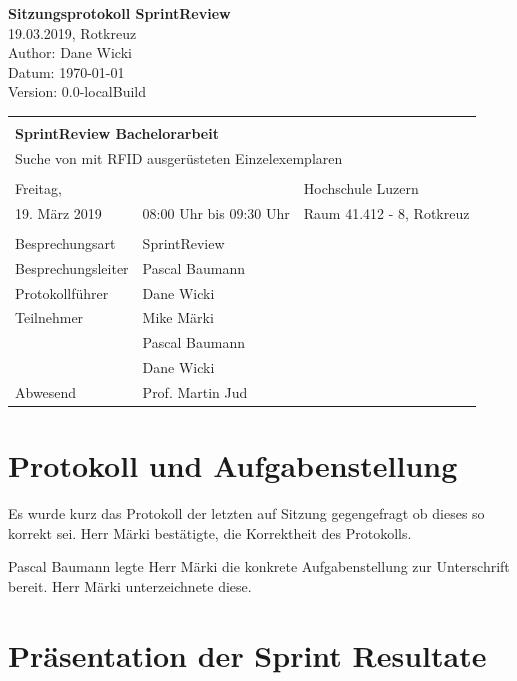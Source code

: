 \documentclass[parskip=full, a4paper]{scrreprt}
\providecommand{\docversion}{0.0-localBuild}
\begin{document}
\begin{titlepage}
\vspace*{2.5cm}
\noindent
\Huge{\textbf{Sitzungsprotokoll SprintReview}} \\
\noindent
\Large{19.03.2019, Rotkreuz}\\
\vfill
\noindent
\large{Author: Dane Wicki}\\
\noindent
\large{Datum: \today}\\
\noindent
\large{Version: \docversion}
\end{titlepage}

\noindent
\begin{tabularx}{\textwidth}{XXl}
\hline \\
\multicolumn{3}{l}{\Large{\textbf{SprintReview  Bachelorarbeit}}}\\
\multicolumn{3}{l}{Suche von mit RFID ausgerüsteten Einzelexemplaren} \\ \\
\hline
	Freitag, & & Hochschule Luzern \\
	19. März 2019 & 08:00 Uhr bis 09:30 Uhr & Raum 41.412 - 8, Rotkreuz \\
\hline \\
\hline
Besprechungsart & SprintReview & \\
\hline
Besprechungsleiter & Pascal Baumann & \\
\hline
Protokollführer & Dane Wicki & \\
\hline
Teilnehmer & Mike Märki & \\ & Pascal Baumann & \\ & Dane Wicki & \\
\hline
Abwesend & Prof. Martin Jud & \\
\hline
\end{tabularx}

	\noindent

\tableofcontents
\clearpage
\chapter{Protokoll und Aufgabenstellung}

Es wurde kurz das Protokoll der letzten auf Sitzung gegengefragt ob dieses so korrekt sei. Herr Märki bestätigte, die Korrektheit des Protokolls.

Pascal Baumann legte Herr Märki die konkrete Aufgabenstellung zur Unterschrift bereit. Herr Märki unterzeichnete diese.

\chapter{Präsentation der Sprint Resultate}
\end{document}
